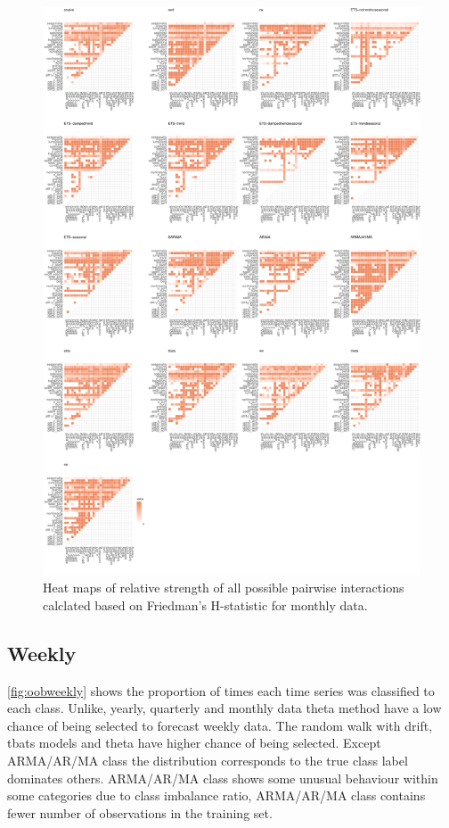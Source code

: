\documentclass[11pt,a4paper,]{article}
\begin{document}
\begin{figure}
\centering
\includegraphics{figures/friedmanM-1.pdf}
\caption{\label{fig:friedmanM}Heat maps of relative strength of all possible
pairwise interactions calclated based on Friedman's H-statistic for
monthly data.}
\end{figure}

\subsection{Weekly}\label{weekly}

\autoref{fig:oobweekly} shows the proportion of times each time series
was classified to each class. Unlike, yearly, quarterly and monthly data
theta method have a low chance of being selected to forecast weekly
data. The random walk with drift, tbats models and theta have higher
chance of being selected. Except ARMA/AR/MA class the distribution
corresponds to the true class label dominates others. ARMA/AR/MA class
shows some unusual behaviour within some categories due to class
imbalance ratio, ARMA/AR/MA class contains fewer number of observations
in the training set.
\end{document}
